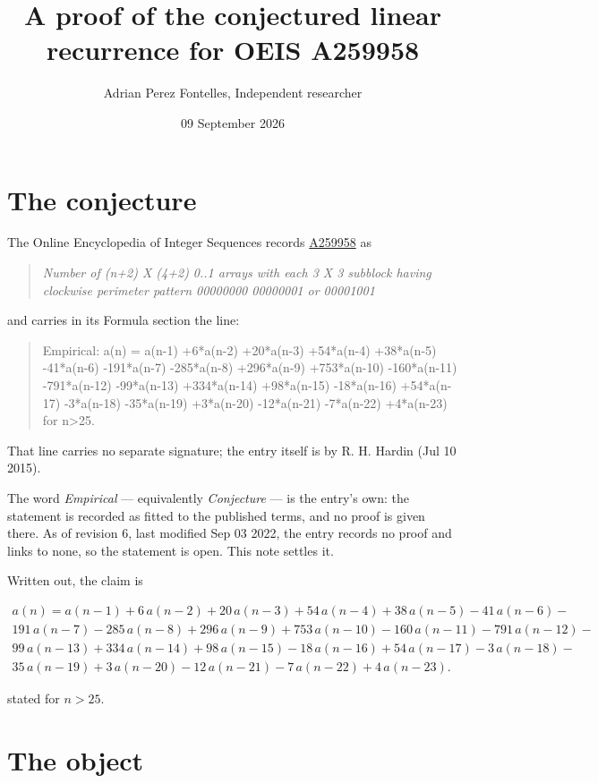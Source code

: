 \documentclass[11pt]{article}
\title{A proof of the conjectured linear recurrence for OEIS A259958}
\author{Adrian Perez Fontelles, Independent researcher}
\date{09 September 2026}
\theoremstyle{definition}
\begin{document}
\maketitle
\section{The conjecture}

The Online Encyclopedia of Integer Sequences records \href{https://oeis.org/A259958}{A259958} as

\begin{quote}\itshape Number of (n+2) X (4+2) 0..1 arrays with each 3 X 3 subblock having clockwise perimeter pattern 00000000 00000001 or 00001001\end{quote}

and carries in its Formula section the line:

\begin{quote}\ttfamily Empirical: a(n) = a(n-1) +6*a(n-2) +20*a(n-3) +54*a(n-4) +38*a(n-5) -41*a(n-6) -191*a(n-7) -285*a(n-8) +296*a(n-9) +753*a(n-10) -160*a(n-11) -791*a(n-12) -99*a(n-13) +334*a(n-14) +98*a(n-15) -18*a(n-16) +54*a(n-17) -3*a(n-18) -35*a(n-19) +3*a(n-20) -12*a(n-21) -7*a(n-22) +4*a(n-23) for n>25.\end{quote}

That line carries no separate signature; the entry itself is by R. H. Hardin (Jul 10 2015).

The word {\itshape Empirical} --- equivalently {\itshape Conjecture} --- is the entry's own: the statement is recorded as fitted to the published terms, and no proof is given there. As of revision 6, last modified Sep 03 2022, the entry records no proof and links to none, so the statement is open. This note settles it.

Written out, the claim is

\begin{multline*} a(n) = a(n-1) + 6\,a(n-2) + 20\,a(n-3) + 54\,a(n-4) + 38\,a(n-5) - 41\,a(n-6) - \\ 191\,a(n-7) - 285\,a(n-8) + 296\,a(n-9) + 753\,a(n-10) - 160\,a(n-11) - 791\,a(n-12) - \\ 99\,a(n-13) + 334\,a(n-14) + 98\,a(n-15) - 18\,a(n-16) + 54\,a(n-17) - 3\,a(n-18) - \\ 35\,a(n-19) + 3\,a(n-20) - 12\,a(n-21) - 7\,a(n-22) + 4\,a(n-23). \end{multline*}

stated for $n > 25$.

\section{The object}
\end{document}
